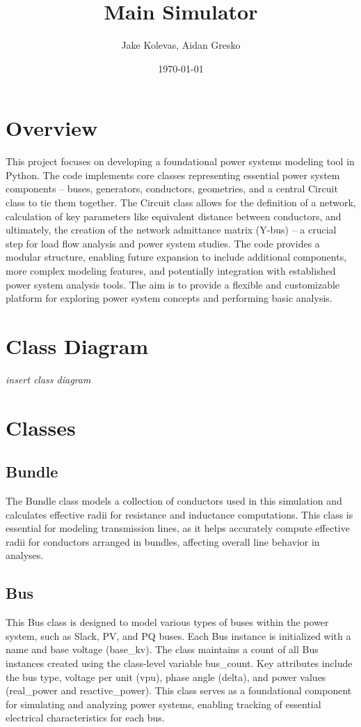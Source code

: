 \documentclass{article}
\author{Jake Kolevas, Aidan Gresko}
\title{Main Simulator}
\date{\today}
\begin{document}
	\maketitle
	
	\section{Overview}
	This project focuses on developing a foundational power systems modeling tool in Python. The code implements core classes representing essential power system components – buses, generators, conductors, geometries, and a central Circuit class to tie them together. The Circuit class allows for the definition of a network, calculation of key parameters like equivalent distance between conductors, and ultimately, the creation of the network admittance matrix (Y-bus) – a crucial step for load flow analysis and power system studies. The code provides a modular structure, enabling future expansion to include additional components, more complex modeling features, and potentially integration with established power system analysis tools. The aim is to provide a flexible and customizable platform for exploring power system concepts and performing basic analysis.
	
	\section{Class Diagram}
	
	\textit{insert class diagram}
	
	\section{Classes}
	
	\subsection{Bundle}
	The Bundle class models a collection of conductors used in this simulation and calculates effective radii for resistance and inductance computations. This class is essential for modeling transmission lines, as it helps accurately compute effective radii for conductors arranged in bundles, affecting overall line behavior in analyses.
	
	\subsection{Bus}
	This Bus class is designed to model various types of buses within the power system, such as Slack, PV, and PQ buses. Each Bus instance is initialized with a name and base voltage (base\_kv). The class maintains a count of all Bus instances created using the class-level variable bus\_count. Key attributes include the bus type, voltage per unit (vpu), phase angle (delta), and power values (real\_power and reactive\_power). This class serves as a foundational component for simulating and analyzing power systems, enabling tracking of essential electrical characteristics for each bus.
	
\end{document}
